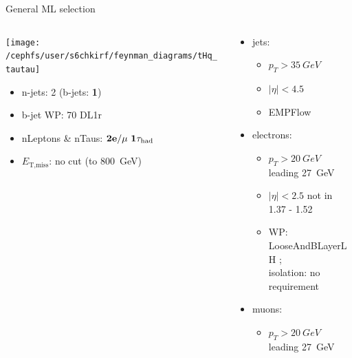 \documentclass[10pt, UKenglish]{beamer}
\begin{document}
\begin{frame}{General ML selection}
    \begin{columns}
      \begin{column}{0.5\textwidth}
        \centering \texttt{[image: /cephfs/user/s6chkirf/feynman\_diagrams/tHq\_tautau]}\\
                \begin{itemize}
          \item n-jets: 2 (b-jets: \textbf{1})
          \item b-jet WP: 70 DL1r
          \item nLeptons \& nTaus: $\bf{2e / \mu~1\tau_{\text{had}}} $
          \item $E_{\text{T,miss}}$: no cut (to \SI{800}{GeV})
        \end{itemize}
      \end{column}
      \begin{column}{0.7\textwidth}
        \vspace*{-0.05\textwidth}
        \begin{itemize}
          \footnotesize
          \item jets:
          \vspace*{-0.02\textwidth}
          \begin{itemize}
            \footnotesize
            \item $p_T>\SI{35}{GeV}$
            \item $|\eta|<4.5$
            \item EMPFlow
          \end{itemize}
          \item electrons:
          \vspace*{-0.02\textwidth}
          \begin{itemize}
            \footnotesize
            \item $p_T>\SI{20}{GeV}$ leading \SI{27}{GeV}
            \item $|\eta|<2.5$ not in 1.37 - 1.52
            \item WP: LooseAndBLayerLH ; \\isolation: no requirement
          \end{itemize}
          \item muons:
          \vspace*{-0.02\textwidth}
          \begin{itemize}
            \footnotesize
            \item $p_T>\SI{20}{GeV}$ leading \SI{27}{GeV}

\end{itemize}
\end{itemize}
\end{column}
\end{columns}
\end{frame}
\end{document}
